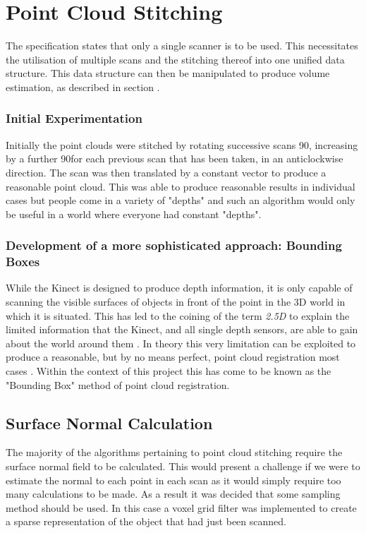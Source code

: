 \section{Point Cloud Stitching}
The specification states that only a single scanner is to be used. 
This necessitates the utilisation of multiple scans and the stitching thereof into one unified data structure. 
This data structure can then be manipulated to produce volume estimation, as described in section .

\subsubsection{Initial Experimentation}
Initially the point clouds were stitched by rotating successive scans 90\deg , increasing by a further 90\deg for each previous scan that has been taken, in an anticlockwise direction. 
The scan was then translated by a constant vector to produce a reasonable point cloud. 
This was able to produce reasonable results in individual cases but people come in a variety of "depths" and such an algorithm would only be useful in a world where everyone had constant "depths". 

\subsubsection{Development of a more sophisticated approach: Bounding Boxes} 
While the Kinect is designed to produce depth information, it is only capable of scanning the visible surfaces of objects in front of the point in the 3D world in which it is situated. 
This has led to the coining of the term \emph{2.5D} to explain the limited information that the Kinect, and all single depth sensors, are able to gain about the world around them \cite{lu2006}. 
In theory this very limitation can be exploited to produce a reasonable, but by no means perfect, point cloud registration most cases . 
Within the context of this project this has come to be known as the "Bounding Box" method of point cloud registration. 

\subsection{Surface Normal Calculation}
The majority of the algorithms pertaining to point cloud stitching require the surface normal field to be calculated. This would present a challenge if we were to estimate the normal to each point in each scan as it would simply require too many calculations to be made. As a result it was decided that some sampling method should be used. In this case a voxel grid filter was implemented to create a sparse representation of the object that had just been scanned.  